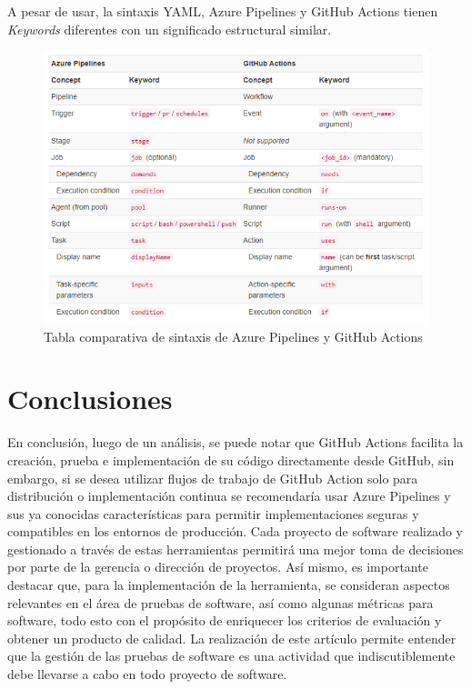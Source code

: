 \documentclass[twoside,twocolumn]{article}
\begin{document}
A pesar de usar, la sintaxis YAML, Azure Pipelines y GitHub Actions tienen \textit{Keywords} diferentes con un significado estructural similar.

\begin{figure}[t]
    \begin{center}
        \includegraphics[width = \columnwidth]{./Imagenes/1 iwr4M9D-eSbMV8ki5xbU2w.png}
        \caption{Tabla comparativa de sintaxis de Azure Pipelines y GitHub Actions}
    \end{center}
\end{figure}


\newpage

\section{Conclusiones}

En conclusión, luego de un análisis, se puede notar que GitHub Actions facilita la creación, prueba e implementación de su código directamente desde GitHub, sin embargo, si se desea utilizar flujos de trabajo de GitHub Action solo para distribución o implementación continua se recomendaría usar Azure Pipelines y sus ya conocidas características para permitir implementaciones seguras y compatibles en los entornos de producción.
Cada proyecto de software realizado y gestionado a través de estas herramientas permitirá una mejor toma de decisiones por parte de la gerencia o dirección de proyectos.
Así mismo, es importante destacar que, para la implementación de la herramienta, se consideran aspectos relevantes en el área de pruebas de software, así como algunas métricas para software, todo esto con el propósito de enriquecer los criterios de evaluación y obtener un producto de calidad.
La realización de este artículo permite entender que la gestión de las pruebas de software es una actividad que indiscutiblemente debe llevarse a cabo en todo proyecto de software.
\end{document}
